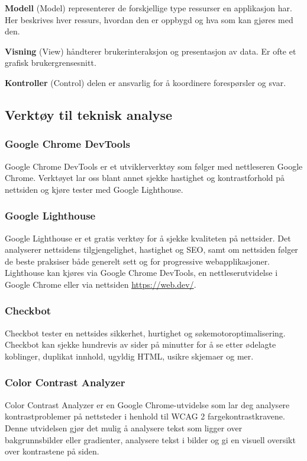\textbf{Modell} (Model) representerer de forskjellige type ressurser en applikasjon har. Her beskrives hver ressurs, hvordan den er oppbygd og hva som kan gjøres med den.

\textbf{Visning} (View) håndterer brukerinteraksjon og presentasjon av data. Er ofte et grafisk brukergrensesnitt.

\textbf{Kontroller} (Control) delen er ansvarlig for å koordinere forespørsler og svar.

\subsection{Verktøy til teknisk analyse}

\subsubsection{Google Chrome DevTools}
\label{sec:google-chrome-devtools}
Google Chrome DevTools \cite{google2019cdt} er et utviklerverktøy som følger med nettleseren Google Chrome. Verktøyet lar oss blant annet sjekke hastighet og kontrastforhold på nettsiden og kjøre tester med Google Lighthouse.

\subsubsection{Google Lighthouse}
\label{sec:google-lighthouse}
Google Lighthouse \cite{google2018lig} er et gratis verktøy for å sjekke kvaliteten på nettsider. Det analyserer nettsidens tilgjengelighet, hastighet og SEO, samt om nettsiden følger de beste praksiser både generelt sett og for progressive webapplikasjoner. Lighthouse kan kjøres via Google Chrome DevTools, en nettleserutvidelse i Google Chrome eller via nettsiden \url{https://web.dev/}.

\subsubsection{Checkbot}
\label{sec:checkbot}
Checkbot \cite{checkbot2019cth} tester en nettsides sikkerhet, hurtighet og søkemotoroptimalisering. Checkbot kan sjekke hundrevis av sider på minutter for å se etter ødelagte koblinger, duplikat innhold, ugyldig HTML, usikre skjemaer og mer.

\subsubsection{Color Contrast Analyzer}
\label{sec:color-contrast-analyzer}
Color Contrast Analyzer \cite{ncstate2013cca} er en Google Chrome-utvidelse som lar deg analysere kontrastproblemer på nettsteder i henhold til WCAG 2 fargekontrastkravene. Denne utvidelsen gjør det mulig å analysere tekst som ligger over bakgrunnsbilder eller gradienter, analysere tekst i bilder og gi en visuell oversikt over kontrastene på siden.

